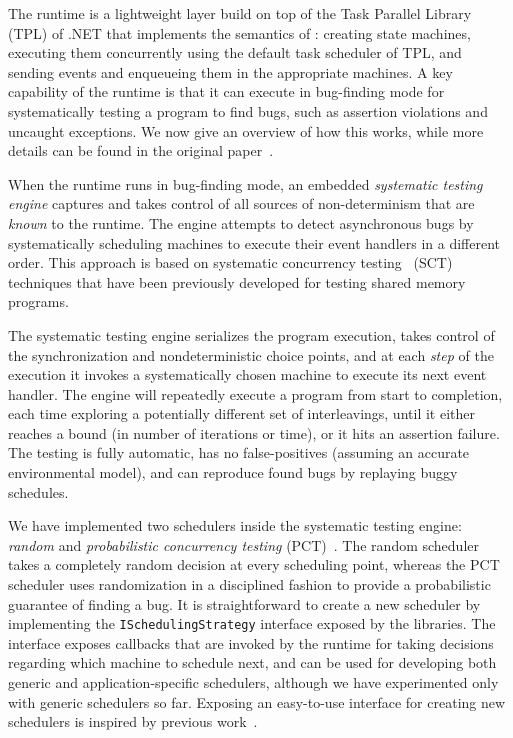 The \psharp runtime is a lightweight layer build on top of the Task Parallel Library (TPL) of .NET that implements the semantics of \psharp: creating state machines, executing them concurrently using the default task scheduler of TPL, and sending events and enqueueing them in the appropriate machines. A key capability of the \psharp runtime is that it can execute in bug-finding mode for systematically testing a \psharp program to find bugs, such as assertion violations and uncaught exceptions. We now give an overview of how this works, while more details can be found in the original paper~\cite{deligiannis2015psharp}.

When the \psharp runtime runs in bug-finding mode, an embedded \emph{systematic testing engine} captures and takes control of all sources of non-determinism that are \emph{known} to the \psharp runtime. The engine attempts to detect asynchronous bugs by systematically scheduling machines to execute their event handlers in a different order. This approach is based on systematic concurrency testing~\cite{godefroid1997verisoft, musuvathi2008finding, emmi2011delay} (SCT) techniques that have been previously developed for testing shared memory programs.

The systematic testing engine serializes the program execution, takes control of the synchronization and nondeterministic choice points, and at each \emph{step} of the execution it invokes a systematically chosen \psharp machine to execute its next event handler. The engine will repeatedly execute a program from start to completion, each time exploring a potentially different set of interleavings, until it either reaches a bound (in number of iterations or time), or it hits an assertion failure. The testing is fully automatic, has no false-positives (assuming an accurate environmental model), and can reproduce found bugs by replaying buggy schedules.

We have implemented two schedulers inside the \psharp systematic testing engine: \emph{random} and \emph{probabilistic concurrency testing} (PCT)~\cite{burckhardt2010pct}. The random scheduler takes a completely random decision at every scheduling point, whereas the PCT scheduler uses randomization in a disciplined fashion to provide a probabilistic guarantee of finding a bug. It is straightforward to create a new scheduler by implementing the \texttt{ISchedulingStrategy} interface exposed by the \psharp libraries. The interface exposes callbacks that are invoked by the \psharp runtime for taking decisions regarding which machine to schedule next, and can be used for developing both generic and application-specific schedulers, although we have experimented only with generic schedulers so far. Exposing an easy-to-use interface for creating new schedulers is inspired by previous work~\cite{desai2015tr}.

